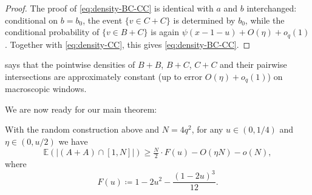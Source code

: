 \documentclass[11pt]{amsart}
\begin{document}
\begin{proof}
The proof of \eqref{eq:density-BC-CC} is identical with $a$ and $b$ interchanged: conditional on $b = b_0$, the event $\{v \in C+C\}$ is determined by $b_0$, while the conditional probability of $\{v \in B+C\}$ is again $\psi(x-1-u) + O(\eta) + o_q(1)$. Together with \eqref{eq:density-CC}, this gives \eqref{eq:density-BC-CC}.
\end{proof}

\begin{remark}
 says that the pointwise densities of $B+B$, $B+C$, $C+C$ and their pairwise intersections are approximately constant (up to error $O(\eta) + o_q(1)$) on macroscopic windows.
\end{remark}

We are now ready for our main theorem:
\begin{theorem}\label{thm:main}
  With the random construction above and $N = 4q^2$, for any $u \in (0, 1/4)$ and $\eta \in (0, u/2)$ we have
  \[
   \mathbb{E}(|(A + A) \cap [1,N]|) \geq \tfrac{N}{2} \cdot F(u) - O(\eta N) - o(N),
  \]
  where
  \begin{equation}\label{eq:Fu-formula}
   F(u) \coloneqq 1 - 2u^2 - \frac{(1 - 2u)^3}{12}.
  \end{equation}
\end{theorem}
\end{document}
